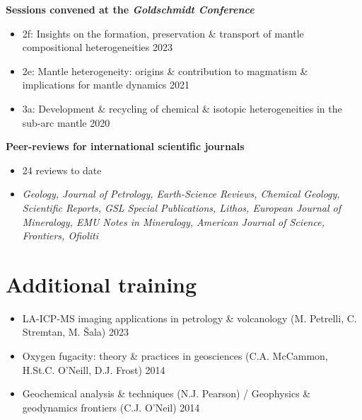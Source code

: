 \documentclass[a4paper,10pt]{article}
\begin{document}
    \textbf{Sessions convened at the \textit{Goldschmidt Conference}}
    \begin{itemize}[label={},itemsep=0pt,parsep=0pt]
    \item 2f: Insights on the formation, preservation \& transport of mantle compositional heterogeneities
        \hfill {2023}
    \item 2e: Mantle heterogeneity: origins \& contribution to magmatism \& implications for mantle dynamics
        \hfill {2021}
    \item 3a: Development \& recycling of chemical \& isotopic heterogeneities in the sub-arc mantle
        \hfill {2020}
    \end{itemize}
    
    \textbf{Peer-reviews for international scientific journals}
    \begin{itemize}[label={},itemsep=0pt,parsep=0pt]
    \item 24 reviews to date
    \item \textit{Geology, Journal of Petrology, Earth-Science Reviews, Chemical Geology, Scientific Reports, GSL Special Publications, Lithos, European Journal of Mineralogy, EMU Notes in Mineralogy, American Journal of Science, Frontiers, Ofioliti}
    \end{itemize}
\section{Additional training}

    \begin{itemize}[label={},itemsep=0pt,parsep=0pt]
        \item LA-ICP-MS imaging applications in petrology \& volcanology (M. Petrelli, C. Stremtan, M. Šala) \hfill {2023}
        \item Oxygen fugacity: theory \& practices in geosciences (C.A. McCammon, H.St.C. O’Neill, D.J. Frost) \hfill {2014}
        \item Geochemical analysis \& techniques (N.J. Pearson) / Geophysics \& geodynamics frontiers (C.J. O’Neil) \hfill {2014}
    \end{itemize}
    
%    
%

\vfill{}
\end{document}
